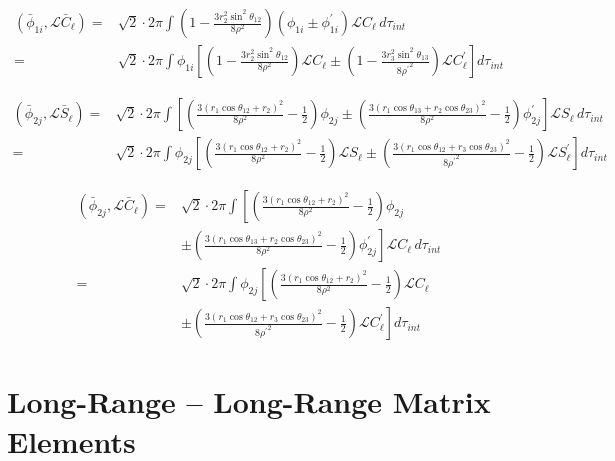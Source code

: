 \documentclass[Dissertation.tex]{subfiles}
\begin{document}
\begin{align}
\label{eq:DWavePhi1CBar}
\nonumber \left(\bar{\phi}_{1i},\mathcal{L} \bar{C}_\ell\right) = & \sqrt{2} \cdot 2\pi \int \left(1 - \frac{3 r_2^2 \sin^2\theta_{12}}{8 \rho^2} \right) \left(\phi_{1i} \pm \phi_{1i}^\prime \right) \mathscr{L}C_\ell \, d\tau_{int} \\
=& \sqrt{2} \cdot 2\pi \int \phi_{1i} \left[ \left(1 - \frac{3 r_2^2 \sin^2\theta_{12}}{8 \rho^2} \right) \mathscr{L}C_\ell \pm \left(1 - \frac{3 r_3^2 \sin^2\theta_{13}}{8 {\rho^\prime}^2} \right) \mathscr{L}C_\ell^\prime \right] d\tau_{int}
\end{align}

\begin{align}
\label{eq:DWavePhi2SBar}
\nonumber \left(\bar{\phi}_{2j},\mathcal{L} \bar{S}_\ell\right) = & \sqrt{2} \cdot 2\pi \int \left[ \left( \frac{3(r_1 \cos\theta_{12} + r_2)^2}{8 \rho^2} - \frac{1}{2} \right) \phi_{2j} \pm \left( \frac{3(r_1 \cos\theta_{13} + r_2 \cos\theta_{23})^2}{8 \rho^2} - \frac{1}{2} \right) \phi_{2j}^\prime \right] \mathscr{L}S_\ell \, d\tau_{int} \\
=& \sqrt{2} \cdot 2\pi \int \phi_{2j} \left[ \left( \frac{3(r_1 \cos\theta_{12} + r_2)^2}{8 \rho^2} - \frac{1}{2} \right) \mathscr{L}S_\ell \pm \left( \frac{3(r_1 \cos\theta_{12} + r_3 \cos\theta_{23})^2}{8 {\rho^\prime}^2} - \frac{1}{2} \right) \mathscr{L}S_\ell^\prime \right] d\tau_{int}
\end{align}

\begin{align}
\label{eq:DWavePhi2CBar}
\nonumber \left(\bar{\phi}_{2j},\mathcal{L} \bar{C}_\ell\right) = & \sqrt{2} \cdot 2\pi \int \left[ \left( \frac{3(r_1 \cos\theta_{12} + r_2)^2}{8 \rho^2} - \frac{1}{2} \right) \phi_{2j} \right. \\
\nonumber & \left. \pm \left( \frac{3(r_1 \cos\theta_{13} + r_2 \cos\theta_{23})^2}{8 \rho^2} - \frac{1}{2} \right) \phi_{2j}^\prime \right] \mathscr{L}C_\ell \, d\tau_{int} \\
\nonumber =& \sqrt{2} \cdot 2\pi \int \phi_{2j} \left[ \left( \frac{3(r_1 \cos\theta_{12} + r_2)^2}{8 \rho^2} - \frac{1}{2} \right) \mathscr{L}C_\ell \right.\\
& \left. \pm \left( \frac{3(r_1 \cos\theta_{12} + r_3 \cos\theta_{23})^2}{8 {\rho^\prime}^2} - \frac{1}{2} \right) \mathscr{L}C_\ell^\prime \right] d\tau_{int}
\end{align}



\section{Long-Range -- Long-Range  Matrix Elements}
\label{sec:DWaveLongLong}
\end{document}
